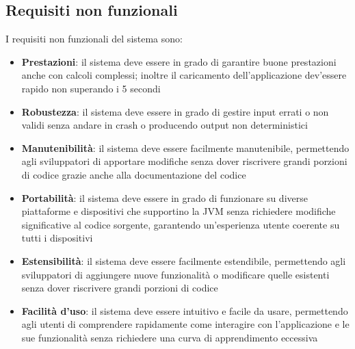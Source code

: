 \subsection{Requisiti non funzionali} \label{subsec:non_functional_requirements}
I requisiti non funzionali del sistema sono:
\begin{itemize}
    \item \textbf{Prestazioni}: il sistema deve essere in grado di garantire buone prestazioni anche con calcoli
    complessi; inoltre il caricamento dell'applicazione dev'essere rapido non superando i 5 secondi
    \item \textbf{Robustezza}: il sistema deve essere in grado di gestire input errati o non validi senza andare in crash
    o producendo output non deterministici
    \item \textbf{Manutenibilità}: il sistema deve essere facilmente manutenibile, permettendo agli sviluppatori
    di apportare modifiche senza dover riscrivere grandi porzioni di codice grazie anche alla documentazione del codice
    \item \textbf{Portabilità}: il sistema deve essere in grado di funzionare su diverse piattaforme e dispositivi 
    che supportino la JVM senza richiedere modifiche significative al codice sorgente, 
    garantendo un'esperienza utente coerente su tutti i dispositivi
    \item \textbf{Estensibilità}: il sistema deve essere facilmente estendibile, permettendo agli sviluppatori di aggiungere
    nuove funzionalità o modificare quelle esistenti senza dover riscrivere grandi porzioni di codice
    \item \textbf{Facilità d'uso}: il sistema deve essere intuitivo e facile da usare, permettendo agli utenti di comprendere
    rapidamente come interagire con l'applicazione e le sue funzionalità senza richiedere una curva di apprendimento eccessiva
\end{itemize}